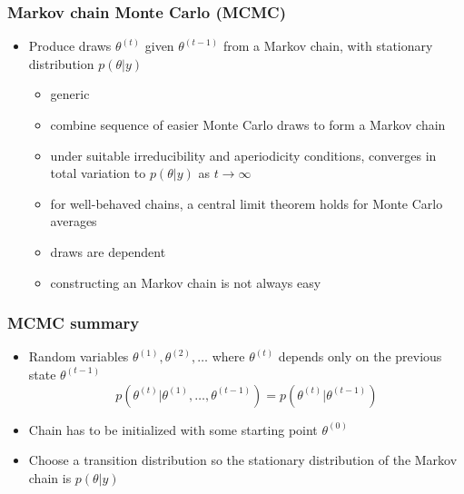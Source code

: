 \documentclass[10pt]{beamer}
\begin{document}


%
%


\begin{frame}

\frametitle{Markov chain Monte Carlo (MCMC)}

  \begin{itemize}
  \item Produce draws $\theta^{(t)}$ given $\theta^{(t-1)}$ from a
    Markov chain, with {\color{uured}stationary distribution} $p(\theta|y)$
    \begin{itemize}
    \item<2->[+] generic
    \item<2->[+] combine sequence of easier Monte Carlo draws to form a Markov chain
    \item<3->[+] under suitable irreducibility and aperiodicity conditions,
      converges in total variation to $p(\theta|y)$ as $t\rightarrow\infty$
    \item<4->[+] for well-behaved chains, a central limit theorem holds
      for Monte Carlo averages
    \item<5->[-] draws are dependent
    \item<5->[-] constructing an  Markov chain is not always easy
    \end{itemize}
\end{itemize}

\end{frame}

\begin{frame}

\frametitle{MCMC summary}

  \begin{itemize}
  \item Random variables $\theta^{(1)},\theta^{(2)},\ldots$ where
    $\theta^{(t)}$ depends only on the previous state $\theta^{(t-1)}$
    \begin{equation*}
      p(\theta^{(t)}|\theta^{(1)},\ldots,\theta^{(t-1)})
      =p(\theta^{(t)}|\theta^{(t-1)})
    \end{equation*}
    \pause
  \item Chain has to be initialized with some starting point $\theta^{(0)}$ \pause
  \item Choose a transition distribution so the
    {\color{uured}stationary distribution} of the Markov chain is $p(\theta|y)$
  \end{itemize}

\end{frame}
\end{document}
